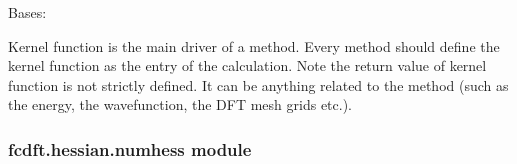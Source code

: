 \documentclass[letterpaper,10pt,english]{sphinxmanual}
\begin{document}
\begin{fulllineitems}
\label{\detokenize{fcdft.hessian:fcdft.hessian.lifcdft.Hessian}}
\pysigstartsignatures
\pysiglinewithargsret
{}
{}
{}
\pysigstopsignatures
\sphinxAtStartPar
Bases: 

\begin{fulllineitems}
\label{\detokenize{fcdft.hessian:fcdft.hessian.lifcdft.Hessian.kernel}}
\pysigstartsignatures
\pysiglinewithargsret
{}
{\sphinxparamcomma {}\sphinxparamcomma {}\sphinxparamcomma {}}
{}
\pysigstopsignatures
\sphinxAtStartPar
Kernel function is the main driver of a method.  Every method should
define the kernel function as the entry of the calculation.  Note the
return value of kernel function is not strictly defined.  It can be
anything related to the method (such as the energy, the wave\sphinxhyphen{}function,
the DFT mesh grids etc.).

\end{fulllineitems}


\end{fulllineitems}



\subsubsection{fcdft.hessian.numhess module}
\label{\detokenize{fcdft.hessian:module-fcdft.hessian.numhess}}\label{\detokenize{fcdft.hessian:fcdft-hessian-numhess-module}}
\end{document}
